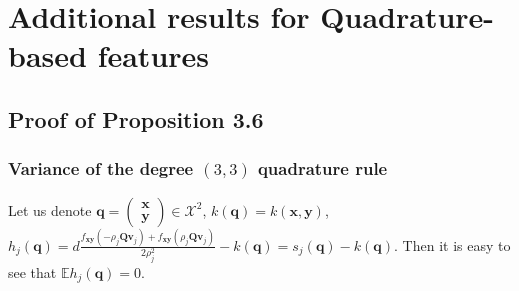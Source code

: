 \chapter{Additional results for Quadrature-based features}

\section{Proof of Proposition 3.6}
\subsection{Variance of the degree $(3, 3)$ quadrature rule}
Let us denote $\mathbf{q} = \begin{pmatrix} \mathbf{x}\\ \mathbf{y} \end{pmatrix} \in \mathcal{X}^2$,
$k(\mathbf{q}) = k(\mathbf{x}, \mathbf{y})$,
$h_j(\mathbf{q}) = d \frac{f_{\mathbf{xy}}(-\rho_j \mathbf{Qv}_j) + f_{\mathbf{xy}}(\rho_j \mathbf{Qv}_j)}{2 \rho_j^2} - k(\mathbf{q}) =
s_j(\mathbf{q}) - k(\mathbf{q})$.
Then it is easy to see that $\mathbb{E}h_j(\mathbf{q}) = 0$.

